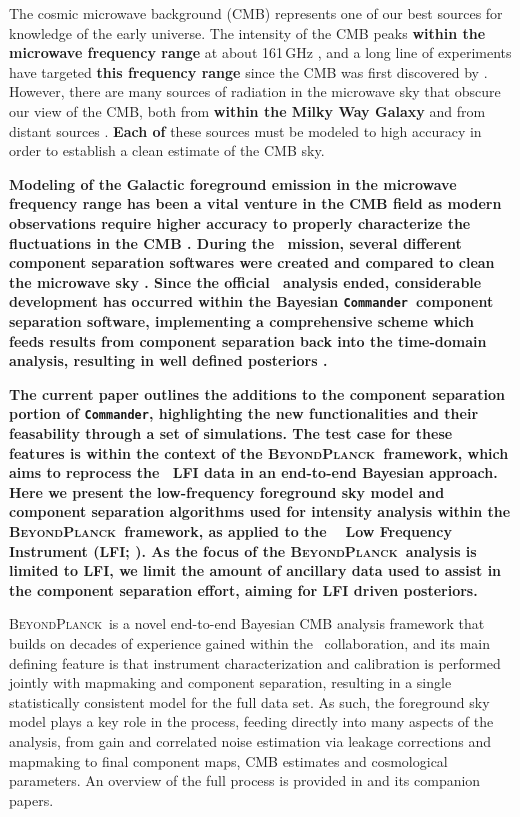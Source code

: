 \documentclass[twocolumn]{aa}
\def\commander{\texttt{Commander}}
\newcommand{\BP}{\textsc{BeyondPlanck}}
\begin{document}
The cosmic microwave background (CMB) represents one of our best
sources for knowledge of the early universe. The intensity of the CMB
peaks \textbf{within the microwave frequency range} at about 161\,GHz \citep{mather:1994}, and a long line of experiments have
targeted \textbf{this frequency range} since the CMB was first
discovered by \citet{penzias:1965}. However, there are many sources of
radiation in the microwave sky that
obscure our view of the CMB, both from \textbf{within the Milky Way Galaxy} and from distant 
sources \citep[see, e.g.,][and references therein]{delabrouille2012,
  planck2016-l04}. \textbf{Each of} these sources must be modeled to high accuracy
in order to establish a clean estimate of the CMB sky.

\textbf{Modeling of the Galactic foreground emission in the microwave frequency range
has been a vital venture in the CMB field as modern observations require higher accuracy
to properly characterize the fluctuations in the CMB \citep{planck2014-a12}. During the 
\Planck\ mission, several different component separation softwares were created and 
compared to clean the microwave sky \citep{planck2016-l04}. Since the official 
\Planck\ analysis ended, considerable development has occurred within the Bayesian
\commander\ component separation software, implementing a comprehensive scheme which
feeds results from component separation back into the time-domain analysis, resulting
in well defined posteriors \citep{bp01}.}

\textbf{The current paper outlines the additions to the component separation portion
of \commander, highlighting the new functionalities and their feasability through a 
set of simulations. The test case for these features is within the context of the 
\BP\ framework, which aims to reprocess the \Planck\ LFI data in an end-to-end
Bayesian approach. Here we present the low-frequency foreground sky model and
component separation algorithms used for intensity analysis within the \BP\ 
framework, as applied to the \Planck\ \citep{planck2016-l01} Low Frequency Instrument
(LFI; \citealp{planck2016-l02}). As the focus of the \BP\ analysis is limited 
to LFI, we limit the amount of ancillary data used to assist in the component
separation effort, aiming for LFI driven posteriors.}

\BP\ is a novel end-to-end Bayesian CMB analysis
framework that builds on decades of experience gained within the
\Planck\ collaboration, and its main defining feature is that
instrument characterization and calibration is performed jointly with
mapmaking and component separation, resulting in a single
statistically consistent model for the full data set. As such, the
foreground sky model plays a key role in the process, feeding directly
into many aspects of the analysis, from gain and correlated noise
estimation via leakage corrections and mapmaking to final component
maps, CMB estimates and cosmological parameters. An overview of the
full process is provided in \citet{bp01} and its companion papers.
\end{document}
